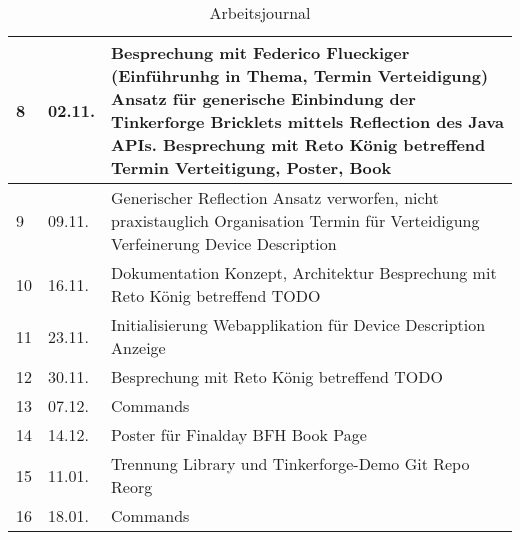 \begin{table}[h!]
\begin{tabularx}{\textwidth}{|l|l|X|}
  8  & 02.11. &  Besprechung mit Federico Flueckiger (Einführunhg in Thema, Termin Verteidigung)    \newline  Ansatz für generische Einbindung der Tinkerforge Bricklets mittels Reflection des Java APIs. \newline Besprechung mit Reto König betreffend Termin Verteitigung, Poster, Book   \\ \hline
  
  9  & 09.11. &  Generischer Reflection Ansatz verworfen, nicht praxistauglich  \newline Organisation Termin für Verteidigung \newline Verfeinerung Device Description   \\ \hline
  
 10  & 16.11. &  Dokumentation Konzept, Architektur \newline Besprechung mit Reto König betreffend TODO  \\ \hline
 
 11  & 23.11. &  Initialisierung Webapplikation für Device Description Anzeige    \\ \hline
 
 12  & 30.11. &  Besprechung mit Reto König betreffend TODO   \\ \hline
 
 13  & 07.12. &  Commands   \\ \hline
 
 14  & 14.12. & Poster für Finalday \newline BFH Book Page   \\ \hline
 
 15  & 11.01. & Trennung Library und Tinkerforge-Demo \newline Git Repo Reorg  \\ \hline
 
 16  & 18.01. & Commands  \\ \hline
 
\end{tabularx}
\caption{Arbeitsjournal}
\end{table}
